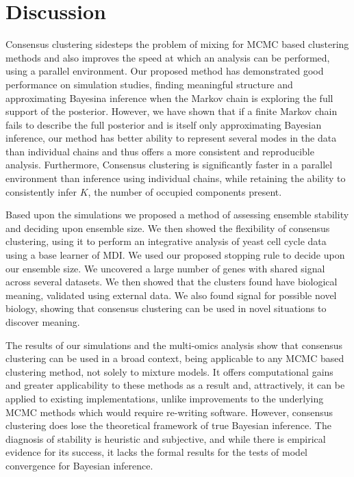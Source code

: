 \documentclass{bioinfo}
\begin{document}

\section{Discussion}

Consensus clustering sidesteps the problem of mixing for MCMC based clustering methods and also improves the speed at which an analysis can be performed, using a parallel environment. Our proposed method has demonstrated good performance on simulation studies, finding meaningful structure and approximating Bayesina inference when the Markov chain is exploring the full support of the posterior. However, we have shown that if a finite Markov chain fails to describe the full posterior and is itself only approximating Bayesian inference, our method has better ability to represent several modes in the data than individual chains and thus offers a more consistent and reproducible analysis. Furthermore, Consensus clustering is significantly faster in a parallel environment than inference using individual chains, while retaining the ability to consistently infer $K$, the number of occupied components present. 

Based upon the simulations we proposed a method of assessing ensemble stability and deciding upon ensemble size. We then showed the flexibility of consensus clustering, using it to perform an integrative analysis of yeast cell cycle data using a base learner of MDI. We used our proposed stopping rule to decide upon our ensemble size. We uncovered a large number of genes with shared signal across several datasets. We then showed that the clusters found have biological meaning, validated using external data. We also found signal for possible novel biology, showing that consensus clustering can be used in novel situations to discover meaning. 

The results of our simulations and the multi-omics analysis show that consensus clustering can be used in a broad context, being applicable to any MCMC based clustering method, not solely to mixture models. It offers computational gains and greater applicability to these methods as a result and, attractively, it can be applied to existing implementations, unlike improvements to the underlying MCMC methods which would require re-writing software. However, consensus clustering does lose the theoretical framework of true Bayesian inference. The diagnosis of stability is heuristic and subjective, and while there is empirical evidence for its success, it lacks the formal results for the tests of model convergence for Bayesian inference.
\end{document}
